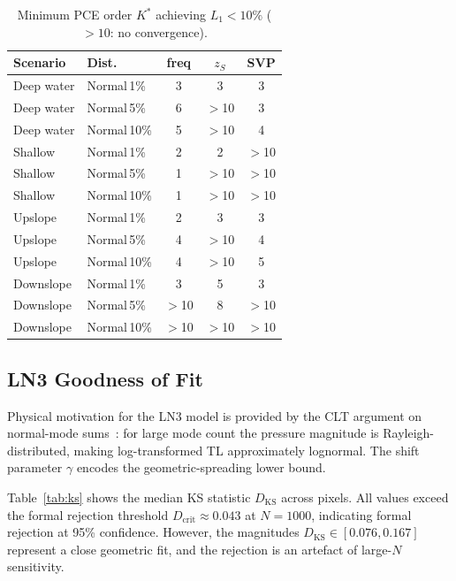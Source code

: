 \documentclass[journal,10pt,twoside]{IEEEtran}
\begin{document}
\begin{table}[H]
  \centering
  \caption{Minimum PCE order $K^*$ achieving $L_1 < 10\%$ ($>10$: no convergence).}
  \label{tab:pce}
  \begin{tabular}{llccc}
    \toprule
    Scenario    & Dist.        & freq  & $z_S$ & SVP   \\
    \midrule
    Deep water  & Normal\,1\%  & 3     & 3     & 3     \\
    Deep water  & Normal\,5\%  & 6     & $>$10 & 3     \\
    Deep water  & Normal\,10\% & 5     & $>$10 & 4     \\
    \midrule
    Shallow     & Normal\,1\%  & 2     & 2     & $>$10 \\
    Shallow     & Normal\,5\%  & 1     & $>$10 & $>$10 \\
    Shallow     & Normal\,10\% & 1     & $>$10 & $>$10 \\
    \midrule
    Upslope     & Normal\,1\%  & 2     & 3     & 3     \\
    Upslope     & Normal\,5\%  & 4     & $>$10 & 4     \\
    Upslope     & Normal\,10\% & 4     & $>$10 & 5     \\
    \midrule
    Downslope   & Normal\,1\%  & 3     & 5     & 3     \\
    Downslope   & Normal\,5\%  & $>$10 & 8     & $>$10 \\
    Downslope   & Normal\,10\% & $>$10 & $>$10 & $>$10 \\
    \bottomrule
  \end{tabular}
\end{table}

\subsection{LN3 Goodness of Fit}

Physical motivation for the LN3 model is provided by the CLT argument on
normal-mode sums~\cite{brekhovskikh1991}: for large mode count the pressure
magnitude is Rayleigh-distributed, making log-transformed TL approximately
lognormal.
The shift parameter $\gamma$ encodes the geometric-spreading lower bound.

Table~\ref{tab:ks} shows the median KS statistic $D_\mathrm{KS}$ across pixels.
All values exceed the formal rejection threshold $D_\mathrm{crit} \approx 0.043$
at $N{=}1000$, indicating formal rejection at 95\% confidence.
However, the magnitudes $D_\mathrm{KS} \in [0.076, 0.167]$ represent a close
geometric fit, and the rejection is an artefact of large-$N$ sensitivity.
\end{document}
